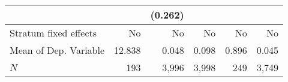 \begin{tabular}{lrrrrr}
                                  &                                     &                                              (0.262) &                                               &                                                     &                                                     \\ 
\midrule
Stratum fixed effects             &                                  No &                                                   No &                                            No &                                                  No &                                                  No \\ 
Mean of Dep. Variable             &                              12.838 &                                                0.048 &                                         0.098 &                                               0.896 &                                               0.045 \\ 
$N$                               &                                 193 &                                                3,996 &                                         3,998 &                                                 249 &                                               3,749 \\ 
\bottomrule
\end{tabular}
